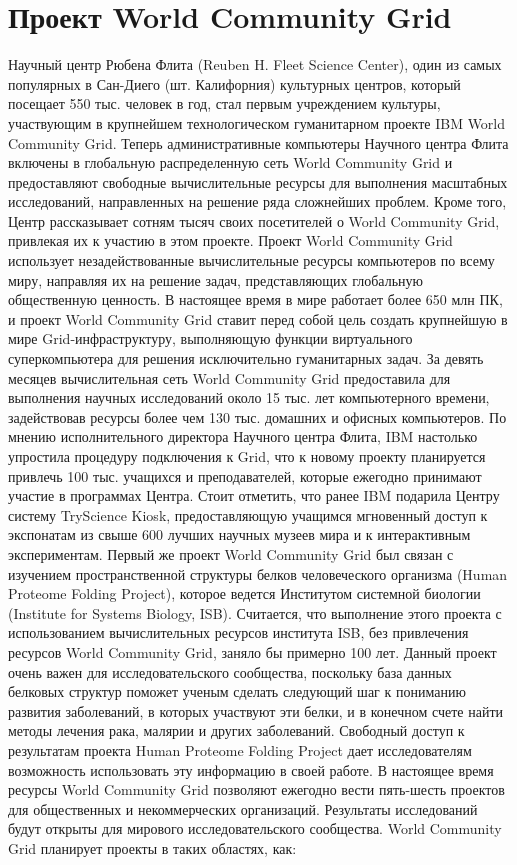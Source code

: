 \documentclass[och, referat]{SCWorks}
\begin{document}
\section{Проект World Community Grid}
Научный центр Рюбена Флита (Reuben H. Fleet Science Center), один из самых популярных в Сан-Диего (шт. Калифорния) культурных центров, который посещает 550 тыс. человек в год, стал первым учреждением культуры, участвующим в крупнейшем технологическом гуманитарном проекте IBM World Community Grid\cite{bib:wwg}. Теперь административные компьютеры Научного центра Флита включены в глобальную распределенную сеть World Community Grid и предоставляют свободные вычислительные ресурсы для выполнения масштабных исследований, направленных на решение ряда сложнейших проблем. Кроме того, Центр рассказывает сотням тысяч своих посетителей о World Community Grid, привлекая их к участию в этом проекте.
Проект World Community Grid использует незадействованные вычислительные ресурсы компьютеров по всему миру, направляя их на решение задач, представляющих глобальную общественную ценность. В настоящее время в мире работает более 650 млн ПК, и проект World Community Grid ставит перед собой цель создать крупнейшую в мире Grid-инфраструктуру, выполняющую функции виртуального суперкомпьютера для решения исключительно гуманитарных задач. За девять месяцев вычислительная сеть World Community Grid предоставила для выполнения научных исследований около 15 тыс. лет компьютерного времени, задействовав ресурсы более чем 130 тыс. домашних и офисных компьютеров.
По мнению исполнительного директора Научного центра Флита, IBM настолько упростила процедуру подключения к Grid, что к новому проекту планируется привлечь 100 тыс. учащихся и преподавателей, которые ежегодно принимают участие в программах Центра. Стоит отметить, что ранее IBM подарила Центру систему TryScience Kiosk\cite{bib:kiosk}, предоставляющую учащимся мгновенный доступ к экспонатам из свыше 600 лучших научных музеев мира и к интерактивным экспериментам.
Первый же проект World Community Grid был связан с изучением пространственной структуры белков человеческого организма (Human Proteome Folding Project), которое ведется Институтом системной биологии (Institute for Systems Biology, ISB). Считается, что выполнение этого проекта с использованием вычислительных ресурсов института ISB, без привлечения ресурсов World Community Grid, заняло бы примерно 100 лет. Данный проект очень важен для исследовательского сообщества, поскольку база данных белковых структур поможет ученым сделать следующий шаг к пониманию развития заболеваний, в которых участвуют эти белки, и в конечном счете найти методы лечения рака, малярии и других заболеваний. Свободный доступ к результатам проекта Human Proteome Folding Project дает исследователям возможность использовать эту информацию в своей работе.
В настоящее время ресурсы World Community Grid позволяют ежегодно вести пять-шесть проектов для общественных и некоммерческих организаций. Результаты исследований будут открыты для мирового исследовательского сообщества. World Community Grid планирует проекты в таких областях, как:
\end{document}
